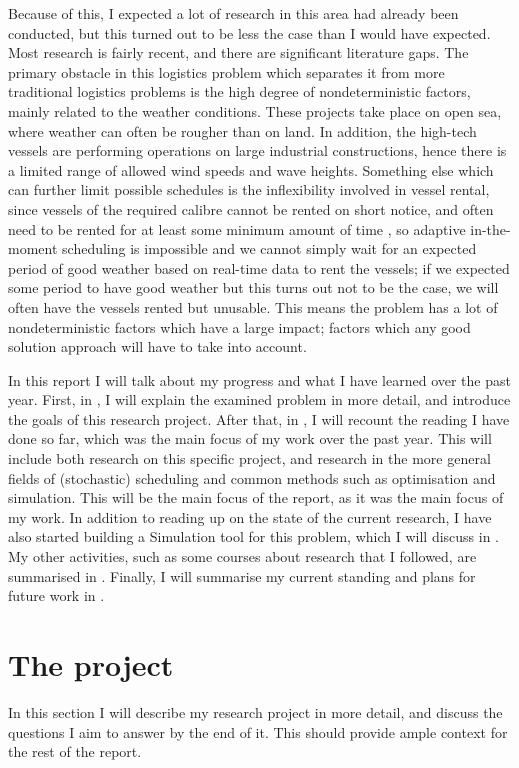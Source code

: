\documentclass[a4paper,12pt]{article}
\begin{document}
Because of this, I expected a lot of research in this area had already been conducted, but this turned out to be less the case than I would have expected. Most research is fairly recent, and there are significant literature gaps. The primary obstacle in this logistics problem which separates it from more traditional logistics problems is the high degree of nondeterministic factors, mainly related to the weather conditions. These projects take place on open sea, where weather can often be rougher than on land. In addition, the high-tech vessels are performing operations on large industrial constructions, hence there is a limited range of allowed wind speeds and wave heights. Something else which can further limit possible schedules is the inflexibility involved in vessel rental, since vessels of the required calibre cannot be rented on short notice, and often need to be rented for at least some minimum amount of time \cite{kerkhove2017optimised}, so adaptive in-the-moment scheduling is impossible and we cannot simply wait for an expected period of good weather based on real-time data to rent the vessels; if we expected some period to have good weather but this turns out not to be the case, we will often have the vessels rented but unusable. This means the problem has a lot of nondeterministic factors which have a large impact; factors which any good solution approach will have to take into account. 

In this report I will talk about my progress and what I have learned over the past year. First, in , I will explain the examined problem in more detail, and introduce the goals of this research project. After that, in , I will recount the reading I have done so far, which was the main focus of my work over the past year. This will include both research on this specific project, and research in the more general fields of (stochastic) scheduling and common methods such as optimisation and simulation. This will be the main focus of the report, as it was the main focus of my work. In addition to reading up on the state of the current research, I have also started building a Simulation tool for this problem, which I will discuss in . My other activities, such as some courses about research that I followed, are summarised in . Finally, I will summarise my current standing and plans for future work in . 

\pagebreak

\section{The project} \label{s:project}
In this section I will describe my research project in more detail, and discuss the questions I aim to answer by the end of it. This should provide ample context for the rest of the report. 
\end{document}
